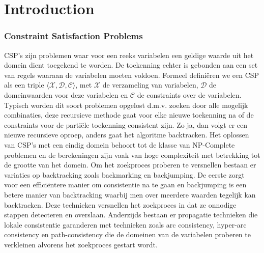\chapter{Introduction}
\label{cha:intro}

\subsection{Constraint Satisfaction Problems}
CSP's zijn problemen waar voor een reeks variabelen een geldige waarde uit het domein dient toegekend te worden. De toekenning echter is gebonden aan een set van regels waaraan de variabelen moeten voldoen. Formeel defini\"{e}ren we een CSP als een triple $\langle \mathcal{X},\mathcal{D},\mathcal{C} \rangle$, met $\mathcal{X}$ de verzameling van variabelen, $\mathcal{D}$ de domeinwaarden voor deze variabelen en $\mathcal{C}$ de constraints over de variabelen. Typisch worden dit soort problemen opgelost d.m.v. zoeken door alle mogelijk combinaties, deze recursieve methode gaat voor elke nieuwe toekenning na of de constraints voor de parti\"{e}le toekenning consistent zijn. Zo ja, dan volgt er een nieuwe recursieve oproep, anders gaat het algoritme backtracken. Het oplossen van CSP's met een eindig domein behoort tot de klasse van NP-Complete problemen en de berekeningen zijn vaak van hoge complexiteit met betrekking tot de grootte van het domein. Om het zoekproces proberen te versnellen bestaan er variaties op backtracking zoals backmarking en backjumping. De eerste zorgt voor een effici\"{e}ntere manier om consistentie na te gaan en backjumping is een betere manier van backtracking waarbij men over meerdere waarden tegelijk kan backtracken. Deze technieken versnellen het zoekproces in dat ze onnodige stappen detecteren en overslaan. Anderzijds bestaan er propagatie technieken die lokale consistentie garanderen met technieken zoals arc consistency, hyper-arc consistency en path-consistency die de domeinen van de variabelen proberen te verkleinen alvorens het zoekproces gestart wordt. 


